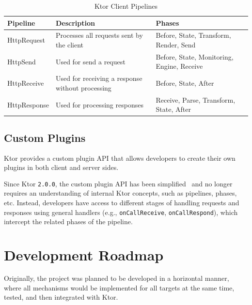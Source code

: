 \begin{table}[!htb]
    \centering
    \caption{Ktor Client Pipelines}
    \label{tab:ktor-client-pipelines}
    \vspace{0.3cm}
    \begin{tabular}{|l|p{6cm}|p{5cm}|p{5cm}|}
        \hline
        \textbf{Pipeline} & \textbf{Description}                             & \textbf{Phases}                            \\ \hline
        HttpRequest       & Processes all requests sent by the client        & Before, State, Transform, Render, Send     \\ \hline
        HttpSend          & Used for send a request                          & Before, State, Monitoring, Engine, Receive \\ \hline
        HttpReceive       & Used for receiving a response without processing & Before, State, After                       \\ \hline
        HttpResponse      & Used for processing responses                    & Receive, Parse, Transform, State, After    \\ \hline
    \end{tabular}
\end{table}

\subsection{Custom Plugins}\label{subsec:custom-plugins}

Ktor provides a custom plugin API that allows developers to create their own plugins in both client and server sides.

Since Ktor \texttt{2.0.0}, the custom plugin API has been simplified~\cite{ktor-server-custom-plugins, ktor-client-custom-plugins} and no longer requires an understanding of internal Ktor concepts, such as pipelines, phases, etc.
Instead, developers have access to different stages of handling requests and responses using general handlers (e.g., \texttt{onCallReceive}, \texttt{onCallRespond}), which intercept the related phases of the pipeline.


\section{Development Roadmap}\label{sec:development-roadmap}

Originally, the project was planned to be developed in a horizontal manner, where all mechanisms would be implemented for all targets at the same time, tested, and then integrated with Ktor.

